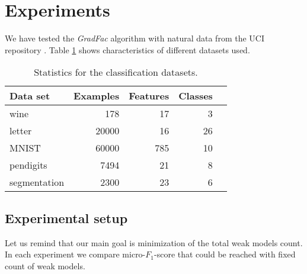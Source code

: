 \documentclass{article}
\begin{document}
\section{Experiments} \label{experiments}
We have tested the \emph{GradFac} algorithm with natural data from the UCI repository \cite{uciRepo}. Table \ref{datasets} shows characteristics of different datasets used.

\begin{table}[t]
\caption{Statistics for the classification datasets.}
\label{datasets}
\vskip 0.15in
\begin{center}
\begin{small}
\begin{sc}
\begin{tabular}{lrrrr}
\hline
\abovespace\belowspace
Data set & Examples & Features & Classes \\
\hline
\abovespace
wine     		& 178 	& 17 	& 3     \\
letter    		& 20000 & 16 	& 26 	\\
MNIST     		& 60000 & 785 	& 10    \\
pendigits 		& 7494 	& 21 	& 8 	\\
segmentation    & 2300 	& 23 	& 6     \\
\hline
\end{tabular}
\end{sc}
\end{small}
\end{center}
\vskip -0.1in
\end{table}
 
\subsection{Experimental setup}
Let us remind that our main goal is minimization of the total weak models count. In each experiment we compare micro-$F_1$-score that could be reached with fixed count of weak models. 
\end{document}
